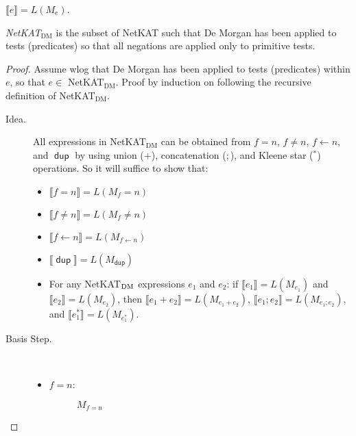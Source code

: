 \documentclass{article}
\newcommand\den[1]{\llbracket #1\rrbracket}
\newcommand\pdup{\mathop{\mathsf{dup}}}
\renewcommand\star{^{\textstyle *}}
\begin{document}
\begin{theorem}
$\den e = L(M_e)$.
\end{theorem}

\begin{definition}
{\em NetKAT$_{\text{DM}}$} is the subset of NetKAT such that De Morgan has
been applied to tests (predicates) so that all negations are applied only to
primitive tests.
\end{definition}

\begin{proof} Assume wlog that De Morgan has been applied to tests (predicates)
within $e$, so that $e \in$ NetKAT$_{\text{DM}}$. Proof by induction on 
following the recursive definition of NetKAT$_{\text{DM}}$.

\begin{description}

\item[Idea.] All expressions in NetKAT$_{\text{DM}}$ can be obtained from 
$f=n$, $f \neq n$, $f \gets n$, and $\pdup$ by using union ($+$), concatenation ($;$), and 
Kleene star ($\star$) operations. So it will suffice to show that:
\begin{itemize}
  \item $\den{f=n} = L(M_f=n)$
  \item $\den{f \neq n} = L(M_f \neq n)$
  \item $\den{f \gets n} = L(M_{f \gets n})$
  \item $\den{\pdup} = L(M_{\pdup})$
  \item For any NetKAT$_{\textnormal{DM}}$ expressions $e_1$ and $e_2$: if
  $\den{e_1} = L(M_{e_1})$ and $\den{e_2} = L(M_{e_2})$, then 
  $\den{e_1+e_2} = L(M_{e_1+e_2})$, $\den{e_1;e_2} = L(M_{e_1;e_2})$, and
  $\den{e_1\star} = L(M_{e_1\star})$.
\end{itemize}
   
  
\item[Basis Step.]
\mbox{ }
  
\begin{itemize}
  \item $f=n$:
  \begin{figure}[H]
    \centering
    \caption{$M_{f=n}$}
  \end{figure}
  

\end{itemize}
\end{description}
\end{proof}
\end{document}
